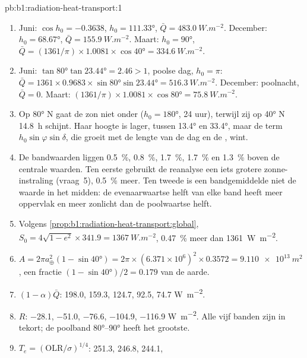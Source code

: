 \begin{solution}{pb:b1:radiation-heat-transport:1}
\begin{enumerate}
  \item Juni: $\cos h_0 = -0.3638$, $h_0 = \ang{111.33}$, $\bar Q =
        \qty{483.0}{W.m^{-2}}$. December: $h_0 = \ang{68.67}$, $\bar Q =
        \qty{155.9}{W.m^{-2}}$. Maart: $h_0 = \ang{90}$, $\bar Q = (1361/\pi)
        \times 1.0081 \times \cos\ang{40} = \qty{334.6}{W.m^{-2}}$.
  \item Juni: $\tan\ang{80}\tan\ang{23.44} = 2.46 > 1$, poolse dag, $h_0 = \pi$:
        $\bar Q = 1361 \times 0.9683 \times \sin\ang{80}\sin\ang{23.44} =
        \qty{516.3}{W.m^{-2}}$. December: poolnacht, $\bar Q = 0$. Maart:
        $(1361/\pi) \times 1.0081 \times \cos\ang{80} = \qty{75.8}{W.m^{-2}}$.
  \item Op \ang{80} N gaat de zon niet onder ($h_0 = \ang{180}$, 24 uur), terwijl zij op \ang{40} N \qty{14.8}{h} schijnt. Haar hoogte is lager, tussen
        \ang{13.4} en \ang{33.4}, maar de term $h_0\sin\varphi\sin\delta$, die groeit met de lengte van de dag en de , wint.
  \item De bandwaarden liggen \qty{0.5}{\percent}, \qty{0.8}{\percent}, \qty{1.7}{\percent}, \qty{1.7}{\percent} en
        \qty{1.3}{\percent} boven de centrale waarden. Ten eerste gebruikt de reanalyse een iets grotere zonne-instraling (vraag~5), \qty{0.5}{\percent} meer. Ten tweede is een bandgemiddelde niet de waarde in het midden: de evenaarwaartse helft van elke band heeft meer oppervlak en meer zonlicht dan de poolwaartse helft.
  \item Volgens \cref{prop:b1:radiation-heat-transport:global}, $S_0 = 4\sqrt{1-e^2}
        \times 341.9 = \qty{1367}{W.m^{-2}}$, \qty{0.47}{\percent} meer dan \qty{1361}{W.m^{-2}}.
  \item $A = 2\pi a_\oplus^2(1 - \sin\ang{40}) = 2\pi \times (6.371\times10^6)^2
        \times 0.3572 = \qty{9.110e13}{m^2}$, een fractie $(1 - \sin\ang{40})/2 =
        0.179$ van de aarde.
  \item $(1 - \alpha)\bar Q$: \num{198.0}, \num{159.3}, \num{124.7}, \num{92.5},
        \num{74.7} \unit{W.m^{-2}}.
  \item $R$: \num{-28.1}, \num{-51.0}, \num{-76.6}, \num{-104.9}, \num{-116.9}
        \unit{W.m^{-2}}. Alle vijf banden zijn in tekort; de poolband
        \ang{80}--\ang{90} heeft het grootste.
  \item $T_e = (\text{OLR}/\sigma)^{1/4}$: \num{251.3}, \num{246.8}, \num{244.1},

\end{enumerate}
\end{solution}

